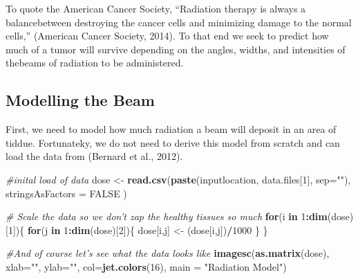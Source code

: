 \documentclass[]{article}
\newenvironment{Shaded}{\begin{snugshade}}{\end{snugshade}}
\newcommand{\KeywordTok}[1]{\textcolor[rgb]{0.13,0.29,0.53}{\textbf{#1}}}
\newcommand{\DataTypeTok}[1]{\textcolor[rgb]{0.13,0.29,0.53}{#1}}
\newcommand{\DecValTok}[1]{\textcolor[rgb]{0.00,0.00,0.81}{#1}}
\newcommand{\StringTok}[1]{\textcolor[rgb]{0.31,0.60,0.02}{#1}}
\newcommand{\CommentTok}[1]{\textcolor[rgb]{0.56,0.35,0.01}{\textit{#1}}}
\newcommand{\OtherTok}[1]{\textcolor[rgb]{0.56,0.35,0.01}{#1}}
\newcommand{\ControlFlowTok}[1]{\textcolor[rgb]{0.13,0.29,0.53}{\textbf{#1}}}
\newcommand{\OperatorTok}[1]{\textcolor[rgb]{0.81,0.36,0.00}{\textbf{#1}}}
\newcommand{\NormalTok}[1]{#1}
\begin{document}
To quote the American Cancer Society, ``Radiation therapy is always a
balancebetween destroying the cancer cells and minimizing damage to the
normal cells,'' (American Cancer Society, 2014). To that end we seek to
predict how much of a tumor will survive depending on the angles,
widths, and intensities of thebeams of radiation to be administered.

\subsection{Modelling the Beam}\label{modelling-the-beam}

First, we need to model how much radiation a beam will deposit in an
area of tiddue. Fortunateky, we do not need to derive this model from
scratch and can load the data from (Bernard et al., 2012).

\begin{Shaded}
\begin{Highlighting}[]
\CommentTok{#inital load of data}
\NormalTok{dose <-}\StringTok{ }\KeywordTok{read.csv}\NormalTok{(}\KeywordTok{paste}\NormalTok{(inputlocation, data.files[}\DecValTok{1}\NormalTok{], }\DataTypeTok{sep=}\StringTok{""}\NormalTok{), }\DataTypeTok{stringsAsFactors =} \OtherTok{FALSE}\NormalTok{ )}

\CommentTok{# Scale the data so we don't zap the healthy tissues so much}
\ControlFlowTok{for}\NormalTok{(i }\ControlFlowTok{in} \DecValTok{1}\OperatorTok{:}\KeywordTok{dim}\NormalTok{(dose)[}\DecValTok{1}\NormalTok{])\{}
  \ControlFlowTok{for}\NormalTok{(j }\ControlFlowTok{in} \DecValTok{1}\OperatorTok{:}\KeywordTok{dim}\NormalTok{(dose)[}\DecValTok{2}\NormalTok{])\{}
\NormalTok{    dose[i,j] <-}\StringTok{ }\NormalTok{(dose[i,j])}\OperatorTok{/}\DecValTok{1000}
\NormalTok{  \}}
\NormalTok{\}}

\CommentTok{#And of course let's see what the data looks like}
\KeywordTok{imagesc}\NormalTok{(}\KeywordTok{as.matrix}\NormalTok{(dose), }\DataTypeTok{xlab=}\StringTok{""}\NormalTok{, }\DataTypeTok{ylab=}\StringTok{""}\NormalTok{, }\DataTypeTok{col=}\KeywordTok{jet.colors}\NormalTok{(}\DecValTok{16}\NormalTok{), }\DataTypeTok{main =} \StringTok{"Radiation Model"}\NormalTok{)}
\end{Highlighting}
\end{Shaded}
\end{document}
